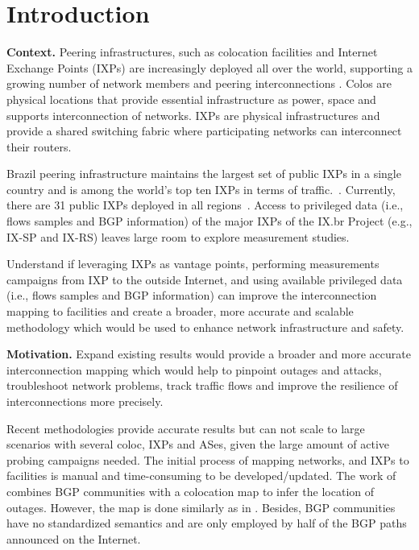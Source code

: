 \chapter{Introduction}\label{cap:introduction}
\thispagestyle{empty}

	\textbf{Context.} Peering infrastructures, such as colocation facilities and Internet Exchange Points (IXPs) are increasingly deployed all over the world, supporting a growing number of network members and peering interconnections \cite{Giotsas:2017:DPI:3098822.3098855}. Colos are physical locations that provide essential infrastructure as power, space and supports interconnection of networks. IXPs are physical infrastructures and provide a shared switching fabric where participating networks can interconnect their routers. \cite{Giotsas:2015:MPI:2716281.2836122}

	Brazil peering infrastructure maintains the largest set of public IXPs in a single country and is among the world’s top ten IXPs in terms of traffic.~\cite{DissectingBrazilianIXP}. Currently, there are 31 public IXPs deployed in all regions~\cite{IXbr}. Access to privileged data (i.e., flows samples and BGP information) of the major IXPs of the IX.br Project (e.g., IX-SP and IX-RS) leaves large room to explore measurement studies. 

	Understand if leveraging IXPs as vantage points, performing measurements campaigns from IXP to the outside Internet, and using available privileged data (i.e., flows samples and BGP information) can improve the interconnection mapping to facilities and create a broader, more accurate and scalable methodology which would be used to enhance network infrastructure and safety.


	\textbf{Motivation.} Expand existing results would provide a broader and more accurate interconnection mapping which would help to pinpoint outages and attacks, troubleshoot network problems, track traffic flows and improve the resilience of interconnections more precisely.

	Recent methodologies \cite{Giotsas:2015:MPI:2716281.2836122} provide accurate results but can not scale to large scenarios with several coloc, IXPs and ASes, given the large amount of active probing campaigns needed. The initial process of mapping networks, and IXPs to facilities is manual and time-consuming to be developed/updated. The work of \cite{Giotsas:2017:DPI:3098822.3098855} combines BGP communities with a colocation map to infer the location of outages. However, the map is done similarly as in \cite{Giotsas:2015:MPI:2716281.2836122}. Besides, BGP communities have no standardized semantics and are only employed by half of the BGP paths announced on the Internet.


